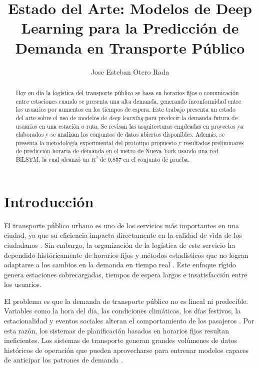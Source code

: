\documentclass[preprint,12pt]{elsarticle}
\begin{document}
\begin{frontmatter}

\title{Estado del Arte: Modelos de Deep Learning para la Predicción de Demanda en Transporte Público}

\author{Jose Esteban Otero Rada}



\begin{abstract}
Hoy en día la logística del transporte público se basa en horarios fijos o comunicación entre estaciones cuando se presenta una alta demanda, generando inconformidad entre los usuarios por aumentos en los tiempos de espera. Este trabajo presenta un estado del arte sobre el uso de modelos de \textit{deep learning} para predecir la demanda futura de usuarios en una estación o ruta. Se revisan las arquitecturas empleadas en proyectos ya elaborados y se analizan los conjuntos de datos abiertos disponibles. Además, se presenta la metodología experimental del prototipo propuesto y resultados preliminares de predicción horaria de demanda en el metro de Nueva York usando una red BiLSTM, la cual alcanzó un $R^2$ de 0{,}857 en el conjunto de prueba.
\end{abstract}

\end{frontmatter}

\section{Introducción}

El transporte público urbano es uno de los servicios más importantes en una ciudad, ya que su eficiencia impacta directamente en la calidad de vida de los ciudadanos \cite{welch2019}. Sin embargo, la organización de la logística de este servicio ha dependido históricamente de horarios fijos y métodos estadísticos que no logran adaptarse a los cambios en la demanda en tiempo real \cite{afandizadeh2024}. Este enfoque rígido genera estaciones sobrecargadas, tiempos de espera largos e insatisfacción entre los usuarios.

El problema es que la demanda de transporte público no es lineal ni predecible. Variables como la hora del día, las condiciones climáticas, los días festivos, la estacionalidad y eventos sociales alteran el comportamiento de los pasajeros \cite{afandizadeh2024}. Por esta razón, los sistemas de planificación basados en horarios fijos resultan ineficientes. Los sistemas de transporte generan grandes volúmenes de datos históricos de operación que pueden aprovecharse para entrenar modelos capaces de anticipar los patrones de demanda \cite{liyanage2022}.
\end{document}
